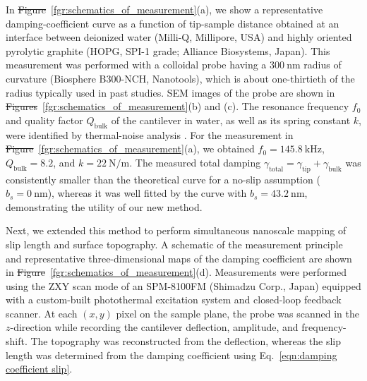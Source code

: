 \documentclass[journal=jacsat,manuscript=article]{achemso}
\providecommand{\DIFadd}[1]{{\protect\color{blue}\uwave{#1}}} %
\providecommand{\DIFdel}[1]{{\protect\color{red}\sout{#1}}} %
\providecommand{\DIFaddbegin}{} %
\providecommand{\DIFaddend}{} %
\providecommand{\DIFdelbegin}{} %
\providecommand{\DIFdelend}{} %
\newcommand{\DIFscaledelfig}{0.5}
\newlength{\DIFdelgraphicswidth} %
\newlength{\DIFdelgraphicsheight} %
\newcommand{\DIFaddincludegraphics}[2][]{{\color{blue}\fbox{\DIFOincludegraphics[#1]{#2}}}} %
\newcommand{\DIFdelincludegraphics}[2][]{%
\sbox{\DIFdelgraphicsbox}{\DIFOincludegraphics[#1]{#2}}%
\settoboxwidth{\DIFdelgraphicswidth}{\DIFdelgraphicsbox} %
\settoboxtotalheight{\DIFdelgraphicsheight}{\DIFdelgraphicsbox} %
\scalebox{\DIFscaledelfig}{%
\parbox[b]{\DIFdelgraphicswidth}{\usebox{\DIFdelgraphicsbox}\\[-\baselineskip] \rule{\DIFdelgraphicswidth}{0em}}\llap{\resizebox{\DIFdelgraphicswidth}{\DIFdelgraphicsheight}{%
\setlength{\unitlength}{\DIFdelgraphicswidth}%
\begin{picture}(1,1)%
\thicklines\linethickness{2pt} %
{\color[rgb]{1,0,0}\put(0,0){\framebox(1,1){}}}%
{\color[rgb]{1,0,0}\put(0,0){\line( 1,1){1}}}%
{\color[rgb]{1,0,0}\put(0,1){\line(1,-1){1}}}%
\end{picture}%
}\hspace*{3pt}}} %
} %
\DeclareRobustCommand{\DIFaddbegin}{\DIFOaddbegin \let\includegraphics\DIFaddincludegraphics} %
\DeclareRobustCommand{\DIFaddend}{\DIFOaddend \let\includegraphics\DIFOincludegraphics} %
\DeclareRobustCommand{\DIFdelbegin}{\DIFOdelbegin \let\includegraphics\DIFdelincludegraphics} %
\DeclareRobustCommand{\DIFdelend}{\DIFOaddend \let\includegraphics\DIFOincludegraphics} %
\begin{document}
In \DIFdelbegin \DIFdel{Figure}\DIFdelend \DIFaddbegin \DIFadd{Fig.}\DIFaddend ~\ref{fgr:schematics_of_measurement}(a), we show a representative damping-coefficient curve as a function of tip-sample distance obtained at an interface between deionized water (Milli-Q, Millipore, USA) and highly oriented pyrolytic graphite (HOPG, SPI-1 grade; Alliance Biosystems, Japan). This measurement was performed with a colloidal probe having a \(\SI{300}{\nano\metre}\) radius of curvature (Biosphere B300-NCH, Nanotools), which is about one-thirtieth of the radius typically used in past studies. SEM images of the probe are shown in \DIFdelbegin \DIFdel{Figures}\DIFdelend \DIFaddbegin \DIFadd{Figs.}\DIFaddend ~\ref{fgr:schematics_of_measurement}(b) and (c). The resonance frequency \(f_0\) and quality factor \(Q_{\text{bulk}}\) of the cantilever in water, as well as its spring constant \(k\), were identified by thermal-noise analysis \cite{Butt1995-nx, Pottier2017-ch}. For the measurement in \DIFdelbegin \DIFdel{Figure}\DIFdelend \DIFaddbegin \DIFadd{Fig.}\DIFaddend ~\ref{fgr:schematics_of_measurement}(a), we obtained \(f_0 = \SI{145.8}{\kilo\hertz}\), \(Q_{\text{bulk}} = 8.2\), and \(k = \SI{22}{\newton\per\metre}\). The measured total damping \(\gamma_{\text{total}}=\gamma_{\text{tip}}+\gamma_{\text{bulk}}\) was consistently smaller than the theoretical curve for a no-slip assumption (\(b_s = \SI{0}{\nano\metre}\)), whereas it was well fitted by the curve with \(b_s = \SI{43.2}{\nano\metre}\), demonstrating the utility of our new method.

Next, we extended this method to perform simultaneous nanoscale mapping of slip length and surface topography. A schematic of the measurement principle and representative three-dimensional maps of the damping coefficient are shown in \DIFdelbegin \DIFdel{Figure}\DIFdelend \DIFaddbegin \DIFadd{Fig.}\DIFaddend ~\ref{fgr:schematics_of_measurement}(d). Measurements were performed using the ZXY scan mode of an SPM-8100FM (Shimadzu Corp., Japan) equipped with a custom-built photothermal excitation system and closed-loop feedback scanner. At each \((x, y)\) pixel on the sample plane, the probe was scanned in the \(z\)-direction while recording the cantilever deflection, amplitude, and frequency-shift. The topography was reconstructed from the deflection, whereas the slip length was determined from the damping coefficient using Eq.~\ref{eqn:damping coefficient slip}. 
\end{document}
